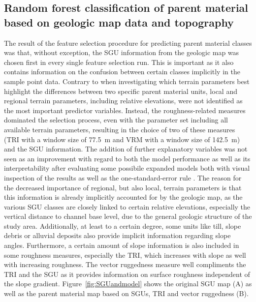 \documentclass[preprint,12pt,authoryear]{elsarticle}
\begin{document}
\subsection{Random forest classification of parent material based on geologic map data and topography}
The result of the feature selection procedure for predicting parent material classes was that, without exception, the SGU information from the geologic map was chosen first in every single feature selection run. This is important as it also contains information on the confusion between certain classes implicitly in the sample point data. Contrary to when investigating which terrain parameters best highlight the differences between two specific parent material units, local and regional terrain parameters, including relative elevations, were not identified as the most important predictor variables. Instead, the roughness-related measures dominated the selection process, even with the parameter set including all available terrain parameters, resulting in the choice of two of these measures (TRI with a window size of 77.5~m and VRM with a window size of 142.5~m) and the SGU information. The addition of further explanatory variables was not seen as an  improvement with regard to both the model performance as well as its interpretability after evaluating some possibile expanded models both with visual inspection of the results as well as the one-standard-error rule \citep{James2013}.  The reason for the decreased importance of regional, but also local, terrain parameters is that this information is already implicitly accounted for by the geologic map, as the various SGU classes are closely linked to certain relative elevations, especially the vertical distance to channel base level, due to the general geologic structure of the study area. Additionally, at least to a certain degree, some units like till, slope debris or alluvial deposits also provide implicit information regarding slope angles. Furthermore, a certain amount of slope information is also included in some roughness measures, especially the TRI, which increases with slope as well with increasing roughness. The vector ruggedness measure well compliments the TRI and the SGU as it provides information on surface roughness independent of the slope gradient. Figure~\ref{fig:SGUandmodel} shows the original SGU map (A) as well as the parent material map based on SGUs, TRI and vector ruggedness (B).
\end{document}
